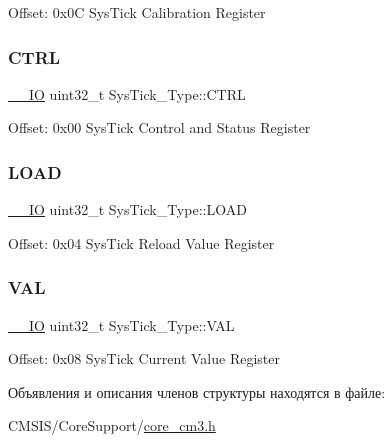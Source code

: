 Offset\+: 0x0C Sys\+Tick Calibration Register ~\newline
 \mbox{\label{struct_sys_tick___type_af2ad94ac83e5d40fc6e34884bc1bec5f}} 
\subsubsection{\texorpdfstring{CTRL}{CTRL}}
{\footnotesize\ttfamily \mbox{\hyperlink{group___c_m_s_i_s___c_m3__core__definitions_gaec43007d9998a0a0e01faede4133d6be}{\+\_\+\+\_\+\+IO}} uint32\+\_\+t Sys\+Tick\+\_\+\+Type\+::\+C\+T\+RL}

Offset\+: 0x00 Sys\+Tick Control and Status Register \mbox{\label{struct_sys_tick___type_ae7bc9d3eac1147f3bba8d73a8395644f}} 
\subsubsection{\texorpdfstring{LOAD}{LOAD}}
{\footnotesize\ttfamily \mbox{\hyperlink{group___c_m_s_i_s___c_m3__core__definitions_gaec43007d9998a0a0e01faede4133d6be}{\+\_\+\+\_\+\+IO}} uint32\+\_\+t Sys\+Tick\+\_\+\+Type\+::\+L\+O\+AD}

Offset\+: 0x04 Sys\+Tick Reload Value Register ~\newline
 \mbox{\label{struct_sys_tick___type_a0997ff20f11817f8246e8f0edac6f4e4}} 
\subsubsection{\texorpdfstring{VAL}{VAL}}
{\footnotesize\ttfamily \mbox{\hyperlink{group___c_m_s_i_s___c_m3__core__definitions_gaec43007d9998a0a0e01faede4133d6be}{\+\_\+\+\_\+\+IO}} uint32\+\_\+t Sys\+Tick\+\_\+\+Type\+::\+V\+AL}

Offset\+: 0x08 Sys\+Tick Current Value Register ~\newline
 

Объявления и описания членов структуры находятся в файле\+:\begin{DoxyCompactItemize}
\item 
C\+M\+S\+I\+S/\+Core\+Support/\mbox{\hyperlink{core__cm3_8h}{core\+\_\+cm3.\+h}}\end{DoxyCompactItemize}
